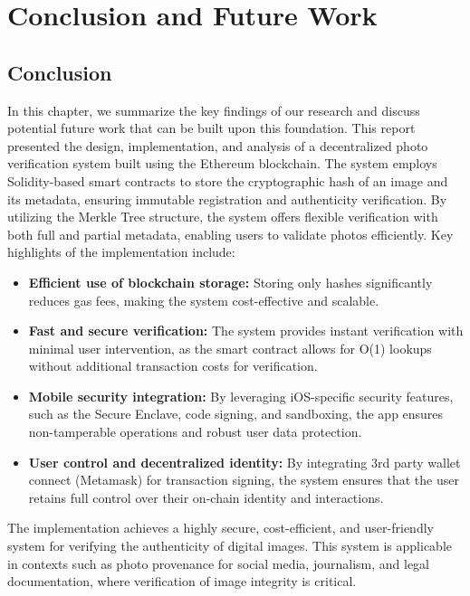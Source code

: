 \chapter{Conclusion and Future Work}
\label{chap:conclusion}

\section{Conclusion}

In this chapter, we summarize the key findings of our research and discuss potential future work that can be built upon this foundation. 
This report presented the design, implementation, and analysis of a decentralized photo verification system built using the Ethereum blockchain. The system employs Solidity-based smart contracts to store the cryptographic hash of an image and its metadata, ensuring immutable registration and authenticity verification. 
By utilizing the Merkle Tree structure, the system offers flexible verification with both full and partial metadata, enabling users to validate photos efficiently.
Key highlights of the implementation include:

\begin{itemize}
    \item \textbf{Efficient use of blockchain storage:} Storing only hashes significantly reduces gas fees, making the system cost-effective and scalable.
    \item \textbf{Fast and secure verification:} The system provides instant verification with minimal user intervention, as the smart contract allows for O(1) lookups without additional transaction costs for verification.
    \item \textbf{Mobile security integration:} By leveraging iOS-specific security features, such as the Secure Enclave, code signing, and sandboxing, the app ensures non-tamperable operations and robust user data protection.
    \item \textbf{User control and decentralized identity:} By integrating 3rd party wallet connect (Metamask) for transaction signing, the system ensures that the user retains full control over their on-chain identity and interactions.
\end{itemize}

The implementation achieves a highly secure, cost-efficient, and user-friendly system for verifying the authenticity of digital images. This system is applicable in contexts such as photo provenance for social media, journalism, and legal documentation, where verification of image integrity is critical.

